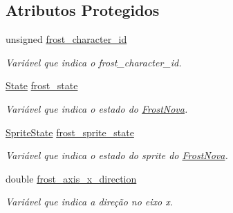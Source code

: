 \subsection*{Atributos Protegidos}
\begin{DoxyCompactItemize}
\item 
\mbox{\label{classFrostNova_ab400bee3d7b37b396b43e99498bca6ee}} 
unsigned \mbox{\hyperlink{classFrostNova_ab400bee3d7b37b396b43e99498bca6ee}{frost\+\_\+character\+\_\+id}}
\begin{DoxyCompactList}\small\item\em Variável que indica o frost\+\_\+character\+\_\+id. \end{DoxyCompactList}\item 
\mbox{\label{classFrostNova_a1e4a13428ec6018ec32826352f5b3303}} 
\mbox{\hyperlink{classFrostNova_a849f88fb08f1a9d3818200ebb8ba7618}{State}} \mbox{\hyperlink{classFrostNova_a1e4a13428ec6018ec32826352f5b3303}{frost\+\_\+state}}
\begin{DoxyCompactList}\small\item\em Variável que indica o estado do \mbox{\hyperlink{classFrostNova}{Frost\+Nova}}. \end{DoxyCompactList}\item 
\mbox{\label{classFrostNova_a8f4c3ad74186879c1364212c4a3316db}} 
\mbox{\hyperlink{classFrostNova_a217d48933042a86cda21d019e09abd9c}{Sprite\+State}} \mbox{\hyperlink{classFrostNova_a8f4c3ad74186879c1364212c4a3316db}{frost\+\_\+sprite\+\_\+state}}
\begin{DoxyCompactList}\small\item\em Variável que indica o estado do sprite do \mbox{\hyperlink{classFrostNova}{Frost\+Nova}}. \end{DoxyCompactList}\item 
\mbox{\label{classFrostNova_a6629b7e6dca4a9cc39b475a7e1308b35}} 
double \mbox{\hyperlink{classFrostNova_a6629b7e6dca4a9cc39b475a7e1308b35}{frost\+\_\+axis\+\_\+x\+\_\+direction}}
\begin{DoxyCompactList}\small\item\em Variável que indica a direção no eixo x. \end{DoxyCompactList}\item 
\mbox{\label{classFrostNova_a256719b17a21ec85291b5970a4209f65}} 

\end{DoxyCompactItemize}
